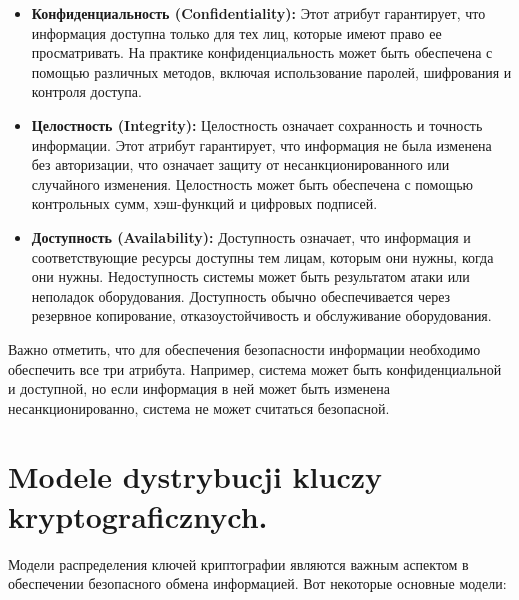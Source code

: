 \begin{itemize}
\item \textbf{Конфиденциальность (Confidentiality):} Этот атрибут гарантирует, что информация доступна только для тех лиц, которые имеют право ее просматривать. На практике конфиденциальность может быть обеспечена с помощью различных методов, включая использование паролей, шифрования и контроля доступа.

\item \textbf{Целостность (Integrity):} Целостность означает сохранность и точность информации. Этот атрибут гарантирует, что информация не была изменена без авторизации, что означает защиту от несанкционированного или случайного изменения. Целостность может быть обеспечена с помощью контрольных сумм, хэш-функций и цифровых подписей.

\item \textbf{Доступность (Availability):} Доступность означает, что информация и соответствующие ресурсы доступны тем лицам, которым они нужны, когда они нужны. Недоступность системы может быть результатом атаки или неполадок оборудования. Доступность обычно обеспечивается через резервное копирование, отказоустойчивость и обслуживание оборудования.
\end{itemize}

Важно отметить, что для обеспечения безопасности информации необходимо обеспечить все три атрибута. Например, система может быть конфиденциальной и доступной, но если информация в ней может быть изменена несанкционированно, система не может считаться безопасной.

\section{Modele dystrybucji kluczy kryptograficznych.}

Модели распределения ключей криптографии являются важным аспектом в обеспечении безопасного обмена информацией. Вот некоторые основные модели:

